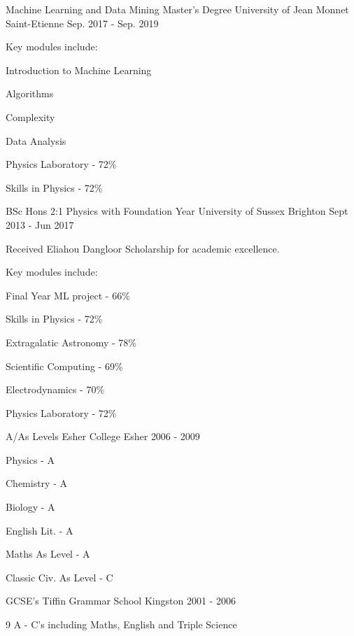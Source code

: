 \begin{cventries}
	\cventry
	{Machine Learning and Data Mining Master's Degree}
	{University of Jean Monnet}
	{Saint-Etienne}
	{Sep. 2017 - Sep. 2019}
	{
		\begin{cvitems}
			\item{Key modules include:}
			\setlength\multicolsep{0pt}
			\begin{multicols}{2}
				\item{Introduction to Machine Learning}
				\item{Algorithms}
				\item{Complexity}
				\item{Data Analysis}
				\item{Physics Laboratory - 72\%}
				\item{Skills in Physics - 72\%}
			\end{multicols}
		\end{cvitems}
	}
	\cventry
    {BSc Hons 2:1 Physics with Foundation Year}
    {University of Sussex}
    {Brighton}
    {Sept 2013 - Jun 2017}
    {
      \begin{cvitems}
      \item{Received Eliahou Dangloor Scholarship for academic excellence.}
      \item{Key modules include:}
      \setlength\multicolsep{0pt}
      \begin{multicols}{2}
        \item{Final Year ML project - 66\% }
        \item{Skills in Physics - 72\%}
        \item{Extragalatic Astronomy - 78\%}
        \item{Scientific Computing - 69\%}
        \item{Electrodynamics - 70\%}
        \item{Physics Laboratory - 72\%}
      \end{multicols}
      \end{cvitems}
    }
  \cventry
    {A/As Levels}
    {Esher College}
    {Esher}
    {2006 - 2009}
    { 
    \begin{cvitems}
    \setlength\multicolsep{0pt}
      \begin{multicols}{2}
      \item{Physics - A}
      \item{Chemistry - A}
      \item{Biology - A}
      \item{English Lit. - A}
      \item{Maths As Level - A}
      \item{Classic Civ. As Level - C}
      \end{multicols}
      \end{cvitems}
    }
  \cventry
    {GCSE's}
    {Tiffin Grammar School}
    {Kingston}
    {2001 - 2006}
    {
    \begin{cvitems}
      \item{9 A - C's including Maths, English and Triple Science}
      \end{cvitems}
    }
\end{cventries}
